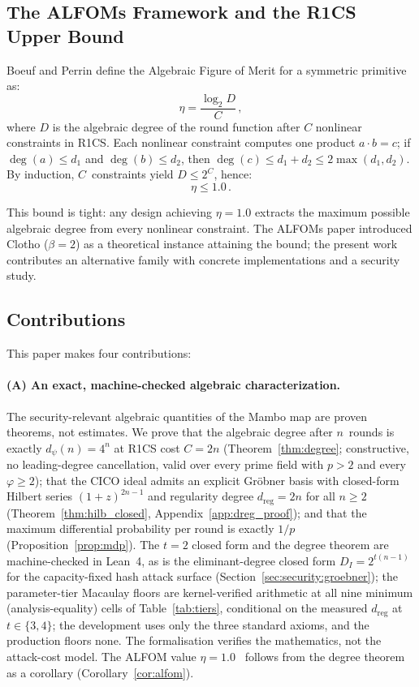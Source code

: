 \documentclass[11pt,a4paper]{article}
\theoremstyle{definition}
\begin{document}
\subsection{The ALFOMs Framework and the R1CS Upper Bound}\label{sec:intro:alfoms}

Boeuf and Perrin define the Algebraic Figure of Merit for a symmetric
primitive as:
\[
  \eta = \frac{\log_2 D}{C}\,,
\]
where $D$ is the algebraic degree of the round function after $C$ nonlinear
constraints in R1CS. Each nonlinear constraint computes one product
$a \cdot b = c$; if $\deg(a) \le d_1$ and $\deg(b) \le d_2$, then
$\deg(c) \le d_1 + d_2 \le 2\max(d_1, d_2)$. By induction, $C$~constraints
yield $D \le 2^C$, hence:
\[
  \eta \le 1.0\,.
\]

This bound is tight: any design achieving $\eta = 1.0$ extracts the maximum
possible algebraic degree from every nonlinear constraint. The ALFOMs
paper introduced Clotho ($\beta=2$) as a theoretical instance attaining
the bound; the present work contributes an alternative family with
concrete implementations and a security study.

\subsection{Contributions}\label{sec:intro:contributions}

This paper makes four contributions:

\paragraph{(A) An exact, machine-checked algebraic characterization.}
The security-relevant algebraic quantities of the Mambo map are proven
theorems, not estimates. We prove that the algebraic degree after
$n$~rounds is exactly $d_\psi(n) = 4^n$ at R1CS cost $C = 2n$
(Theorem~\ref{thm:degree}; constructive, no leading-degree
cancellation, valid over every prime field with $p > 2$ and every
$\varphi \ge 2$); that the CICO ideal admits an explicit Gr\"obner
basis with closed-form Hilbert series $(1+z)^{2n-1}$ and regularity
degree $d_{\mathrm{reg}} = 2n$ for all $n \ge 2$
(Theorem~\ref{thm:hilb_closed}, Appendix~\ref{app:dreg_proof}); and
that the maximum differential probability per round is exactly $1/p$
(Proposition~\ref{prop:mdp}). The $t=2$ closed form and the degree
theorem are machine-checked in Lean~4, as is the eliminant-degree
closed form $D_I = 2^{t(n-1)}$ for the capacity-fixed hash attack
surface (Section~\ref{sec:security:groebner}); the parameter-tier
Macaulay floors are kernel-verified arithmetic at all nine minimum
(analysis-equality) cells of Table~\ref{tab:tiers}, conditional on
the measured $d_{\mathrm{reg}}$ at $t \in \{3, 4\}$; the
development uses only the
three standard axioms, and the production floors none. The
formalisation verifies the mathematics, not the attack-cost model.
The ALFOM value $\eta = 1.0$~\cite{ALFOMs} follows from the degree
theorem as a corollary (Corollary~\ref{cor:alfom}).
\end{document}
